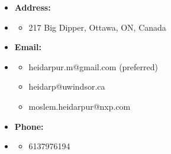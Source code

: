 \documentclass[12pt,oneside]{book}
\begin{document}
\begin {itemize}
\item  [] {\bf  Address:} \vspace{-1.5em}
\item []  {\bf \hrulefill } \vspace{-1em}
\begin {itemize} 
\item  \small 217 Big Dipper, Ottawa, ON, Canada
\end{itemize}  \vspace{0.5em}
\item  []  {\bf  Email:} \vspace{-1.5em}
\item []  {\bf \hrulefill } \vspace{-1em}
\begin {itemize} 
 \item  \small heidarpur.m@gmail.com (preferred)
 \item \small heidarp@uwindsor.ca
 \item \small moslem.heidarpur@nxp.com
\end {itemize}   \vspace{0.5em}
\item  []   {\bf Phone:} \vspace{-1.5em}
\item []  {\bf \hrulefill } \vspace{-1em}
\begin {itemize} 
\item 6137976194
\end{itemize}
\end{itemize}

\newpage
 
\newpage


\newpage

\newpage

\newpage

\newpage

\newpage




\newpage

%

%
\newpage

\newpage
 
 
  
  
    
 
 
\end{document}
